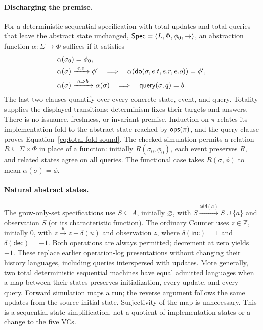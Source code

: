 \paragraph{Discharging the premise.}
For a deterministic sequential specification with total updates and total
queries that leave the abstract state unchanged,
$\mathsf{Spec}=\langle L,\Phi,\phi_0,\rightarrow\rangle$, an abstraction
function $\alpha:\Sigma\to\Phi$ suffices if it satisfies
\begin{align*}
 &\alpha(\sigma_0)=\phi_0,\\
 &\alpha(\sigma)\xrightarrow{\ e.o\ }\phi'
   \quad\Longrightarrow\quad
   \alpha(\mathsf{do}(\sigma,e.t,e.r,e.o))=\phi',\\
 &\alpha(\sigma)\xrightarrow{\ q\Rightarrow b\ }\alpha(\sigma)
   \quad\Longrightarrow\quad \mathsf{query}(\sigma,q)=b.
\end{align*}
The last two clauses quantify over every concrete state, event, and query.
Totality supplies the displayed transitions; determinism fixes their targets
and answers. There is no issuance, freshness, or invariant premise.
Induction on $\pi$ relates its implementation fold to the abstract state reached
by $\mathsf{ops}(\pi)$, and the query clause proves
Equation~\eqref{eq:total-fold-sound}. The checked simulation permits a relation
$R\subseteq\Sigma\times\Phi$ in place of a function: initially
$R(\sigma_0,\phi_0)$, each event preserves $R$, and related states agree on all
queries. The functional case takes $R(\sigma,\phi)$ to mean
$\alpha(\sigma)=\phi$.

\paragraph{Natural abstract states.}\label{par:natural-states}
The grow-only-set specifications use $S\subseteq A$, initially $\varnothing$,
with $S\xrightarrow{\mathsf{add}(a)}S\cup\{a\}$ and observation $S$ (or its
characteristic function). The ordinary Counter uses $z\in\mathbb Z$, initially
$0$, with $z\xrightarrow{u}z+\delta(u)$ and observation $z$, where
$\delta(\mathsf{inc})=1$ and $\delta(\mathsf{dec})=-1$. Both operations
are always permitted; decrement at zero yields $-1$. These replace
earlier operation-log presentations without changing their history languages,
including queries interspersed with updates. More generally, two total
deterministic sequential machines have equal admitted languages when a map
between their states preserves initialization, every update, and every query.
Forward simulation maps a run; the reverse argument follows the same updates
from the source initial state. Surjectivity of the map is unnecessary.
This is a sequential-state simplification, not a quotient of implementation
states or a change to the five VCs.

